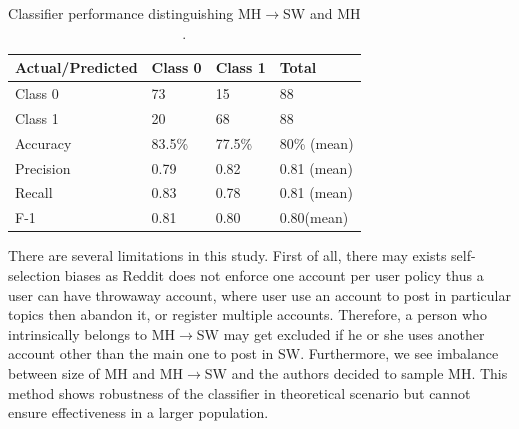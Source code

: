 \begin{table}
\small
\noindent\begin{tabularx}{\textwidth}{X|X|X|X}
Actual/Predicted & Class 0 & Class 1 & Total\\ 
\toprule
Class 0 & 73 & 15  & 88\\
Class 1 & 20 &  68 & 88\\ 
\midrule
Accuracy  & 83.5\%  & 77.5\% & 80\% (mean)\\
Precision & 0.79  &   0.82  & 0.81   (mean)\\
Recall     & 0.83   &    0.78   & 0.81 (mean)\\
F-1        &    0.81  &  0.80     &  0.80(mean)\\
\bottomrule
\end{tabularx}
\caption{Classifier performance distinguishing MH$\rightarrow$SW and MH \cite{DeChoudhury2016}.}
\label{tab:classifier_performance}
\end{table}
There are several limitations in this study. First of all, there may exists self-selection biases as Reddit does not enforce one account per user policy thus a user can have throwaway account, where user use an account to post in particular topics then abandon it, or register multiple accounts. Therefore, a person who intrinsically belongs to  MH$\rightarrow$SW may get excluded if he or she uses another account other than the main one to post in SW. Furthermore, we see imbalance between size of MH and MH$\rightarrow$SW and the authors decided to sample MH. This method shows robustness of the classifier in theoretical scenario but cannot ensure effectiveness in a larger population. 


